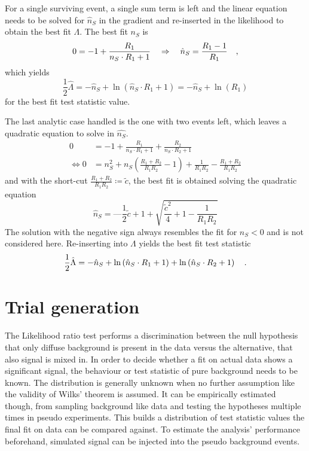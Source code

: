 For a single surviving event, a single sum term is left and the linear equation needs to be solved for $\hat{n}_S$ in the gradient and re-inserted in the likelihood to obtain the best fit $\Lambda$.
The best fit $n_S$ is
\begin{equation}
  0 = -1 + \frac{R_1}{n_S\cdot R_1 + 1}
    \quad\Rightarrow\quad \hat{n}_S = \frac{R_1 - 1}{R_1}
  \quad\text{,}
\end{equation}
which yields
\begin{equation}
  \frac{1}{2}\hat{\Lambda}
    = -\hat{n}_S + \ln\left( \hat{n}_S \cdot R_1 + 1 \right)
    = -\hat{n}_S + \ln(R_1)
\end{equation}
for the best fit test statistic value.

The last analytic case handled is the one with two events left, which leaves a quadratic equation to solve in $\hat{n_S}$.
\begin{align}
  0 &= -1 + \frac{R_1}{n_S\cdot R_1 + 1} + \frac{R_2}{n_S\cdot R_2 + 1} \\
  \Leftrightarrow
  0 &= n_S^2 + n_S \left(\frac{R_1 + R_2}{R_1 R_2} - 1\right) +
       \frac{1}{R_1 R_2} - \frac{R_1 + R_2}{R_1 R_2}
\end{align}
and with the short-cut $\frac{R_1 + R_2}{R_1 R_2} \coloneq\tilde{c}$, the best fit is obtained solving the quadratic equation
\begin{equation}
  \hat{n}_S = —\frac{1}{2}\tilde{c} + 1 + \sqrt{\frac{\tilde{c}^2}{4} + 1 - \frac{1}{R_1 R_2}}
\end{equation}
The solution with the negative sign always resembles the fit for $n_S < 0$ and is not considered here.
Re-inserting into $\Lambda$ yields the best fit test statistic
\begin{equation}
  \frac{1}{2}\hat{\Lambda} = -\hat{n}_S +
                             \ln\left( \hat{n}_S \cdot R_1 + 1 \right) +
                             \ln\left( \hat{n}_S \cdot R_2 + 1 \right)
  \quad\text{.}
\end{equation}

\section{Trial generation}
The Likelihood ratio test performs a discrimination between the null hypothesis that only diffuse background is present in the data versus the alternative, that also signal is mixed in.
In order to decide whether a fit on actual data shows a significant signal, the behaviour or test statistic of pure background needs to be known.
The distribution is generally unknown when no further assumption like the validity of Wilks' theorem is assumed.
It can be empirically estimated though, from sampling background like data and testing the hypotheses multiple times in pseudo experiments.
This builds a distribution of test statistic values the final fit on data can be compared against.
To estimate the analysis' performance beforehand, simulated signal can be injected into the pseudo background events.

